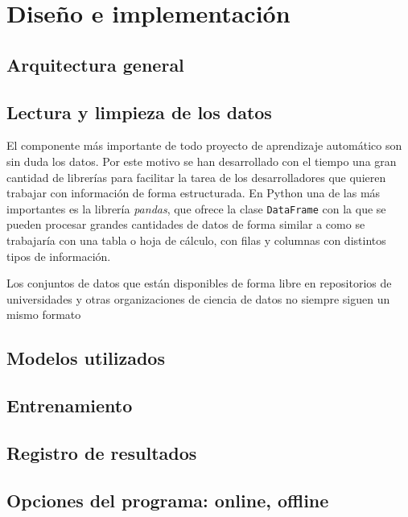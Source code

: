 \chapter{Diseño e implementación}
\label{chap:diseño}


\section{Arquitectura general}


\section{Lectura y limpieza de los datos}

El componente más importante de todo proyecto de aprendizaje automático son sin duda los datos. 
Por este motivo se han desarrollado con el tiempo una gran cantidad de librerías para facilitar la tarea de los desarrolladores que quieren trabajar con información de forma estructurada. 
En Python una de las más importantes es la librería \emph{pandas}, que ofrece la clase \verb|DataFrame| con la que se pueden procesar grandes cantidades de datos de forma similar a como se trabajaría con una tabla o hoja de cálculo, con filas y columnas con distintos tipos de información.

Los conjuntos de datos que están disponibles de forma libre en repositorios de universidades y otras organizaciones de ciencia de datos no siempre siguen un mismo formato 




\section{Modelos utilizados}


\section{Entrenamiento}

\section{Registro de resultados}

\section{Opciones del programa: online, offline}

\clearpage
